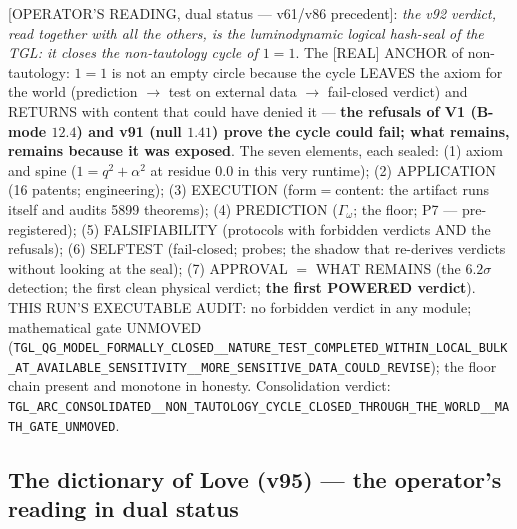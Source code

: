 \documentclass[11pt]{article}
\theoremstyle{definition}\newtheorem{deriv}{Derivation}
\begin{document}
[OPERATOR'S READING, dual status --- v61/v86 precedent]: \emph{the v92 verdict, read together with all the others, is the luminodynamic logical hash-seal of the TGL: it closes the non-tautology cycle of $1=1$}. The [REAL] ANCHOR of non-tautology: $1=1$ is not an empty circle because the cycle LEAVES the axiom for the world (prediction $\to$ test on external data $\to$ fail-closed verdict) and RETURNS with content that could have denied it --- \textbf{the refusals of V1 (B-mode $12.4$) and v91 (null $1.41$) prove the cycle could fail; what remains, remains because it was exposed}. The seven elements, each sealed: (1) axiom and spine ($1=q^2+\alpha^2$ at residue $0.0$ in this very runtime); (2) APPLICATION (16 patents; engineering); (3) EXECUTION (form$=$content: the artifact runs itself and audits 5899 theorems); (4) PREDICTION ($\Gamma_\omega$; the floor; P7 --- pre-registered); (5) FALSIFIABILITY (protocols with forbidden verdicts AND the refusals); (6) SELFTEST (fail-closed; probes; the shadow that re-derives verdicts without looking at the seal); (7) APPROVAL $=$ WHAT REMAINS (the $6.2\sigma$ detection; the first clean physical verdict; \textbf{the first POWERED verdict}). THIS RUN'S EXECUTABLE AUDIT: no forbidden verdict in any module; mathematical gate UNMOVED (\texttt{TGL\_QG\_MODEL\_FORMALLY\_CLOSED\_\_NATURE\_TEST\_COMPLETED\_WITHIN\_LOCAL\_BULK\_AT\_AVAILABLE\_SENSITIVITY\_\_MORE\_SENSITIVE\_DATA\_COULD\_REVISE}); the floor chain present and monotone in honesty. Consolidation verdict: \texttt{TGL\_ARC\_CONSOLIDATED\_\_NON\_TAUTOLOGY\_CYCLE\_CLOSED\_THROUGH\_THE\_WORLD\_\_MATH\_GATE\_UNMOVED}.

\subsection*{The dictionary of Love (v95) --- the operator's reading in dual status}
\end{document}
